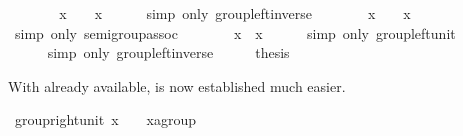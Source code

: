 \begin{isabellebody}
\ \ \isamarkupfalse%
\ \isamarkupfalse%
\ {\isachardoublequoteopen}{\isachardot}{\isachardot}{\isachardot}\ {\isacharequal}\ {\isacharparenleft}x{\isasyminv}{\isacharparenright}{\isasyminv}\ {\isasymodot}\ {\isasymone}\ {\isasymodot}\ x{\isasyminv}{\isachardoublequoteclose}\isanewline
\ \ \ \ \isamarkupfalse%
\ {\isacharparenleft}simp\ only{\isacharcolon}\ group{\isachardot}left{\isacharunderscore}inverse{\isacharparenright}\isanewline
\ \ \isamarkupfalse%
\ \isamarkupfalse%
\ {\isachardoublequoteopen}{\isachardot}{\isachardot}{\isachardot}\ {\isacharequal}\ {\isacharparenleft}x{\isasyminv}{\isacharparenright}{\isasyminv}\ {\isasymodot}\ {\isacharparenleft}{\isasymone}\ {\isasymodot}\ x{\isasyminv}{\isacharparenright}{\isachardoublequoteclose}\isanewline
\ \ \ \ \isamarkupfalse%
\ {\isacharparenleft}simp\ only{\isacharcolon}\ semigroup{\isachardot}assoc{\isacharparenright}\isanewline
\ \ \isamarkupfalse%
\ \isamarkupfalse%
\ {\isachardoublequoteopen}{\isachardot}{\isachardot}{\isachardot}\ {\isacharequal}\ {\isacharparenleft}x{\isasyminv}{\isacharparenright}{\isasyminv}\ {\isasymodot}\ x{\isasyminv}{\isachardoublequoteclose}\isanewline
\ \ \ \ \isamarkupfalse%
\ {\isacharparenleft}simp\ only{\isacharcolon}\ group{\isachardot}left{\isacharunderscore}unit{\isacharparenright}\isanewline
\ \ \isamarkupfalse%
\ \isamarkupfalse%
\ {\isachardoublequoteopen}{\isachardot}{\isachardot}{\isachardot}\ {\isacharequal}\ {\isasymone}{\isachardoublequoteclose}\isanewline
\ \ \ \ \isamarkupfalse%
\ {\isacharparenleft}simp\ only{\isacharcolon}\ group{\isachardot}left{\isacharunderscore}inverse{\isacharparenright}\isanewline
\ \ \isamarkupfalse%
\ \isamarkupfalse%
\ {\isacharquery}thesis\ \isacommand{{\isachardot}}\isamarkupfalse%
\isanewline
{}\isamarkupfalse%
%
\endisatagproof
{\isafoldproof}%
%
\isadelimproof
%
\endisadelimproof
%
\begin{isamarkuptext}%
\noindent With  already available, \label{thm:group-right-unit} is now established
  much easier.%
\end{isamarkuptext}%
\isamarkuptrue%
\isamarkupfalse%
\ group{\isacharunderscore}right{\isacharunderscore}unit{\isacharcolon}\ {\isachardoublequoteopen}x\ {\isasymodot}\ {\isasymone}\ {\isacharequal}\ {\isacharparenleft}x{\isasymColon}{\isacharprime}a{\isasymColon}group{\isacharparenright}{\isachardoublequoteclose}\isanewline

\end{isabellebody}
